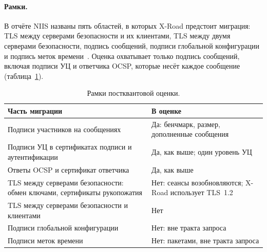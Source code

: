 \documentclass[conference,a4paper]{IEEEtran}
\newcommand{\newred}[1]{{\color{red}#1}}
\begin{document}
{\newred{\paragraph{Рамки.} В отчёте NIIS названы пять областей, в которых X-Road предстоит миграция: TLS
между серверами безопасности и их клиентами, TLS между двумя серверами безопасности, подпись
сообщений, подписи глобальной конфигурации и подпись меток времени~\cite{bakhtina2026pqc}.
Оценка охватывает только подпись сообщений, включая подписи УЦ и ответчика OCSP,
которые несёт каждое сообщение (таблица~\ref{tab:pqscope}).}

\begin{table}[!htb]
\centering\footnotesize
\setlength{\tabcolsep}{3pt}
\caption{\newred{Рамки постквантовой оценки.}}
\label{tab:pqscope}
\color{red}
\begin{tabular}{@{}p{}p{}@{}}
\toprule
Часть миграции & В оценке \\
\midrule
Подписи участников на сообщениях & Да: бенчмарк, размер, дополненные сообщения \\
Подписи УЦ в сертификатах подписи и аутентификации & Да, как выше; один уровень УЦ \\
Ответы OCSP и сертификат ответчика & Да, как выше \\
TLS между серверами безопасности: обмен ключами, сертификаты рукопожатия & Нет: сеансы возобновляются; X-Road использует TLS~1.2 \\
TLS между серверами безопасности и клиентами & Нет \\
Подписи глобальной конфигурации & Нет: вне тракта запроса \\
Подписи меток времени & Нет: пакетами, вне тракта запроса \\
\bottomrule
\end{tabular}
\end{table}

}
\end{document}

